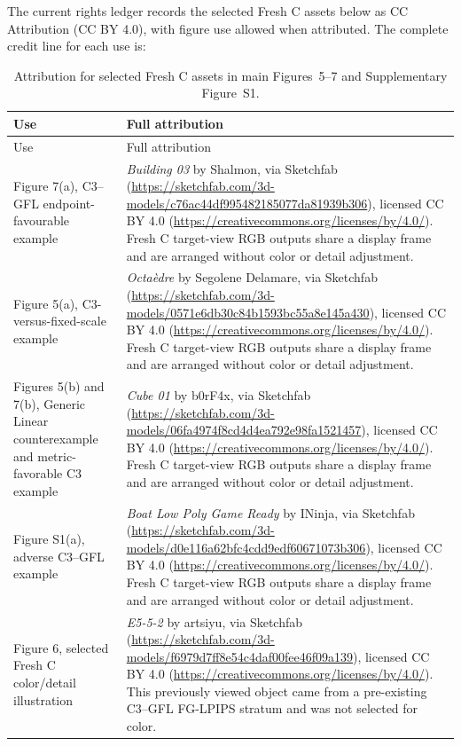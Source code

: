 \documentclass[11pt]{article}
\begin{document}
The current rights ledger records the selected Fresh C assets below as CC Attribution (CC BY 4.0), with figure use allowed when attributed. The complete credit line for each use is:
\begin{longtable}{p{4.3cm}p{10.9cm}}
\caption{Attribution for selected Fresh C assets in main Figures~5--7 and Supplementary Figure~S1.}\label{tab:supp-credits}\\
\toprule Use & Full attribution \\
\midrule\endfirsthead
\toprule Use & Full attribution \\
\midrule\endhead
Figure 7(a), C3--GFL endpoint-favourable example & \emph{Building 03} by Shalmon, via Sketchfab (\url{https://sketchfab.com/3d-models/c76ac44df995482185077da81939b306}), licensed CC BY 4.0 (\url{https://creativecommons.org/licenses/by/4.0/}). Fresh C target-view RGB outputs share a display frame and are arranged without color or detail adjustment. \\
Figure 5(a), C3-versus-fixed-scale example & \emph{Octaèdre} by Segolene Delamare, via Sketchfab (\url{https://sketchfab.com/3d-models/0571e6db30c84b1593bc55a8e145a430}), licensed CC BY 4.0 (\url{https://creativecommons.org/licenses/by/4.0/}). Fresh C target-view RGB outputs share a display frame and are arranged without color or detail adjustment. \\
Figures 5(b) and 7(b), Generic Linear counterexample and metric-favorable C3 example & \emph{Cube 01} by b0rF4x, via Sketchfab (\url{https://sketchfab.com/3d-models/06fa4974f8cd4d4ea792e98fa1521457}), licensed CC BY 4.0 (\url{https://creativecommons.org/licenses/by/4.0/}). Fresh C target-view RGB outputs share a display frame and are arranged without color or detail adjustment. \\
Figure S1(a), adverse C3--GFL example & \emph{Boat Low Poly Game Ready} by INinja, via Sketchfab (\url{https://sketchfab.com/3d-models/d0e116a62bfc4cdd9edf60671073b306}), licensed CC BY 4.0 (\url{https://creativecommons.org/licenses/by/4.0/}). Fresh C target-view RGB outputs share a display frame and are arranged without color or detail adjustment. \\
Figure 6, selected Fresh C color/detail illustration & \emph{E5-5-2} by artsiyu, via Sketchfab (\url{https://sketchfab.com/3d-models/f6979d7ff8e54c4daf00fee46f09a139}), licensed CC BY 4.0 (\url{https://creativecommons.org/licenses/by/4.0/}). This previously viewed object came from a pre-existing C3--GFL FG-LPIPS stratum and was not selected for color. \\
\bottomrule
\end{longtable}
\end{document}
